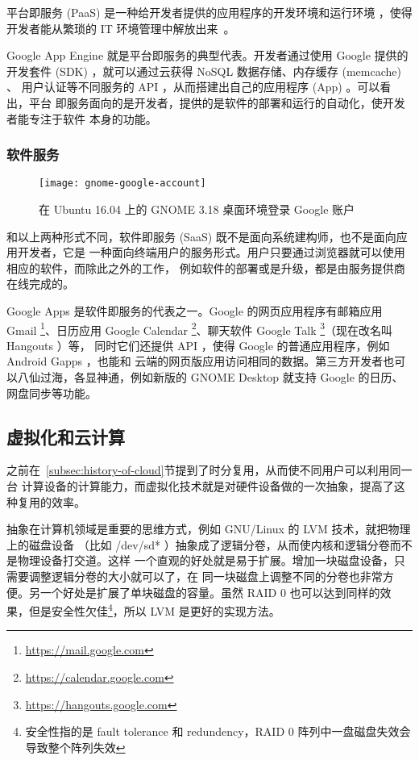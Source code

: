 平台即服务 (PaaS) 是一种给开发者提供的应用程序的开发环境和运行环境
，使得开发者能从繁琐的 IT 环境管理中解放出来~\cite{cloud-and-openstack}。

Google App Engine 就是平台即服务的典型代表。开发者通过使用 Google 提供的
开发套件 (SDK) ，就可以通过云获得 NoSQL 数据存储、内存缓存 (memcache) 、
用户认证等不同服务的 API ，从而搭建出自己的应用程序 (App) 。可以看出，平台
即服务面向的是开发者，提供的是软件的部署和运行的自动化，使开发者能专注于软件
本身的功能。

\subsubsection{软件服务}

\begin{figure}[h]
    \centering
    \texttt{[image: gnome-google-account]}
    \caption{在 Ubuntu 16.04 上的 GNOME 3.18 桌面环境登录 Google 账户}
\end{figure}

和以上两种形式不同，软件即服务 (SaaS) 既不是面向系统建构师，也不是面向应用开发者，它是
一种面向终端用户的服务形式。用户只要通过浏览器就可以使用相应的软件，而除此之外的工作，
例如软件的部署或是升级，都是由服务提供商在线完成的。

Google Apps 是软件即服务的代表之一。Google 的网页应用程序有邮箱应用 Gmail
 \footnote{\url{https://mail.google.com}}、日历应用 Google Calendar
 \footnote{\url{https://calendar.google.com}}、聊天软件 Google Talk
 \footnote{\url{https://hangouts.google.com}}（现在改名叫 Hangouts ）等，
同时它们还提供 API ，使得 Google 的普通应用程序，例如 Android Gapps ，也能和
云端的网页版应用访问相同的数据。第三方开发者也可以八仙过海，各显神通，例如新版的
 GNOME Desktop 就支持 Google 的日历、网盘同步等功能。

\subsection{虚拟化和云计算}

之前在~\ref{subsec:history-of-cloud}节提到了时分复用，从而使不同用户可以利用同一台
计算设备的计算能力，而虚拟化技术就是对硬件设备做的一次抽象，提高了这种复用的效率。

抽象在计算机领域是重要的思维方式，例如 GNU/Linux 的 LVM 技术，就把物理上的磁盘设备
（比如 /dev/sd* ）抽象成了逻辑分卷，从而使内核和逻辑分卷而不是物理设备打交道。这样
一个直观的好处就是易于扩展。增加一块磁盘设备，只需要调整逻辑分卷的大小就可以了，在
同一块磁盘上调整不同的分卷也非常方便。另一个好处是扩展了单块磁盘的容量。虽然 RAID 0
也可以达到同样的效果，但是安全性欠佳\footnote{安全性指的是 fault tolerance 和
 redundency，RAID 0 阵列中一盘磁盘失效会导致整个阵列失效}，所以 LVM 是更好的实现方法。

